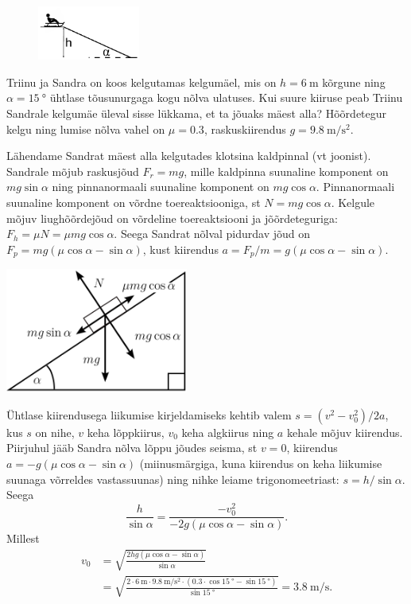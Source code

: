 
\begin{figure}
  \vspace*{-5mm}
    \includegraphics[width=0.3\textwidth]{2024-v3g-01-yl.pdf}
\end{figure}
Triinu ja Sandra on koos kelgutamas kelgumäel, mis on $h=\SI{6}{\m}$ kõrgune ning $\alpha=\SI{15}{\degree}$ ühtlase tõusunurgaga kogu nõlva ulatuses. Kui suure kiiruse peab Triinu Sandrale kelgumäe üleval sisse lükkama, et ta jõuaks mäest alla? Hõõrdetegur kelgu ning lumise nõlva vahel on $\mu=\num{0.3}$, raskuskiirendus $g=\SI{9.8}{\m\per\s\squared}$.


\hint

\solu
Lähendame Sandrat mäest alla kelgutades klotsina kaldpinnal (vt joonist). Sandrale mõjub raskusjõud $F_r=mg$, mille kaldpinna suunaline komponent on $mg\sin\alpha$ ning pinnanormaali suunaline komponent on $mg\cos\alpha$. Pinnanormaali suunaline komponent on võrdne toereaktsiooniga, st $N=mg\cos\alpha$. Kelgule mõjuv liughõõrdejõud on võrdeline toereaktsiooni ja jõõrdeteguriga: $F_h=\mu N=\mu mg\cos\alpha$. Seega Sandrat nõlval pidurdav jõud on $F_p = mg(\mu \cos\alpha - \sin\alpha)$, kust kiirendus $a=F_p/m=g(\mu \cos\alpha - \sin\alpha)$.
\begin{center}
\includegraphics[width=0.45\textwidth]{2024-v3g-01-yl.png}
\end{center}
Ühtlase kiirendusega liikumise kirjeldamiseks kehtib valem $s=(v^2-v_0^2)/2a$, kus $s$ on nihe, $v$ keha lõppkiirus, $v_0$ keha algkiirus ning $a$ kehale mõjuv kiirendus. Piirjuhul jääb Sandra nõlva lõppu jõudes seisma, st $v=0$, kiirendus $a=-g(\mu \cos\alpha - \sin\alpha)$ (miinusmärgiga, kuna kiirendus on keha liikumise suunaga võrreldes vastassuunas) ning nihke leiame trigonomeetriast: $s=h/\sin\alpha$. Seega
\[
  \frac{h}{\sin\alpha} = \frac{-v_0^2}{-2g(\mu \cos\alpha - \sin\alpha)}.
\]
Millest
\begin{align*}
  v_0 &= \sqrt{\frac{2hg(\mu \cos\alpha - \sin\alpha)}{\sin\alpha}}\\
  &= \sqrt{\frac{2\cdot\SI{6}{\m}\cdot \SI{9.8}{\m\per\s\squared}  \cdot (0.3\cdot \cos \SI{15}{\degree}  - \sin\SI{15}{\degree})}{\sin\SI{15}{\degree}}} = \SI{3.8}{\m\per\s}.
\end{align*}
\probend
